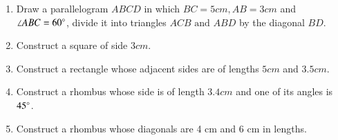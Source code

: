 \begin{enumerate}[label=\thesection.\arabic*,ref=\thesection.\theenumi]
\item Draw a parallelogram ${ABCD}$ in which $BC=5 cm, AB=3 cm$ and $\angle{ABC}=60\degree$, divide it into triangles ${ACB}\text{ and }{ABD}$ by the diagonal $BD$. 
\item Construct a square of side $3 cm$.
\item Construct  a rectangle whose adjacent sides are of lengths $5 cm$ and $3.5 cm$.
\item Construct a rhombus whose side is of length $3.4 cm$ and one of its angles is $45\degree$.
\item Construct a rhombus whose diagonals are 4 cm and 6 cm in lengths.
\end{enumerate}
